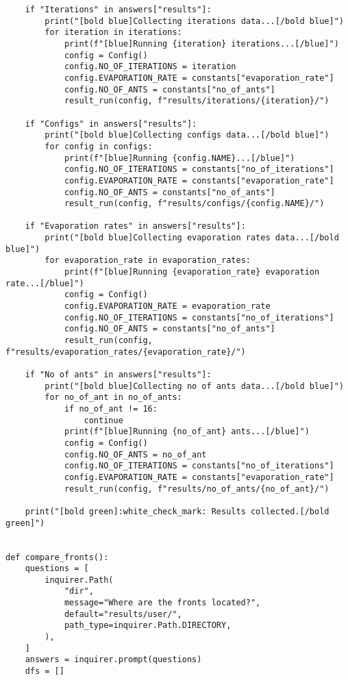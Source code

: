 \begin{verbatim}
    if "Iterations" in answers["results"]:
        print("[bold blue]Collecting iterations data...[/bold blue]")
        for iteration in iterations:
            print(f"[blue]Running {iteration} iterations...[/blue]")
            config = Config()
            config.NO_OF_ITERATIONS = iteration
            config.EVAPORATION_RATE = constants["evaporation_rate"]
            config.NO_OF_ANTS = constants["no_of_ants"]
            result_run(config, f"results/iterations/{iteration}/")

    if "Configs" in answers["results"]:
        print("[bold blue]Collecting configs data...[/bold blue]")
        for config in configs:
            print(f"[blue]Running {config.NAME}...[/blue]")
            config.NO_OF_ITERATIONS = constants["no_of_iterations"]
            config.EVAPORATION_RATE = constants["evaporation_rate"]
            config.NO_OF_ANTS = constants["no_of_ants"]
            result_run(config, f"results/configs/{config.NAME}/")

    if "Evaporation rates" in answers["results"]:
        print("[bold blue]Collecting evaporation rates data...[/bold blue]")
        for evaporation_rate in evaporation_rates:
            print(f"[blue]Running {evaporation_rate} evaporation rate...[/blue]")
            config = Config()
            config.EVAPORATION_RATE = evaporation_rate
            config.NO_OF_ITERATIONS = constants["no_of_iterations"]
            config.NO_OF_ANTS = constants["no_of_ants"]
            result_run(config, f"results/evaporation_rates/{evaporation_rate}/")

    if "No of ants" in answers["results"]:
        print("[bold blue]Collecting no of ants data...[/bold blue]")
        for no_of_ant in no_of_ants:
            if no_of_ant != 16:
                continue
            print(f"[blue]Running {no_of_ant} ants...[/blue]")
            config = Config()
            config.NO_OF_ANTS = no_of_ant
            config.NO_OF_ITERATIONS = constants["no_of_iterations"]
            config.EVAPORATION_RATE = constants["evaporation_rate"]
            result_run(config, f"results/no_of_ants/{no_of_ant}/")

    print("[bold green]:white_check_mark: Results collected.[/bold green]")


def compare_fronts():
    questions = [
        inquirer.Path(
            "dir",
            message="Where are the fronts located?",
            default="results/user/",
            path_type=inquirer.Path.DIRECTORY,
        ),
    ]
    answers = inquirer.prompt(questions)
    dfs = []


\end{verbatim}
